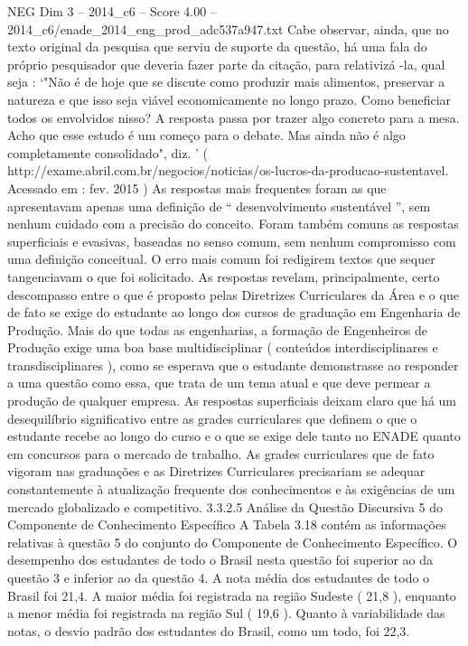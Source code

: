 \begin{textsample}{NEG Dim 3 – 2014\_c6 – Score 4.00 – 2014\_c6/enade\_2014\_eng\_prod\_adc537a947.txt}
Cabe observar, ainda, que no texto original da pesquisa que serviu de suporte da questão, há uma fala do próprio pesquisador que deveria fazer parte da citação, para relativizá -la, qual seja : ‘"Não é de hoje que se discute como produzir mais alimentos, preservar a natureza e que isso seja viável economicamente no longo prazo.
Como beneficiar todos os envolvidos nisso?
A resposta passa por trazer algo concreto para a mesa.
Acho que esse estudo é um começo para o debate.
Mas ainda não é algo completamente consolidado", diz. ’ ( http://exame.abril.com.br/negocios/noticias/os-lucros-da-producao-sustentavel.
Acessado em : fev. 2015 ) As respostas mais frequentes foram as que apresentavam apenas uma definição de “ desenvolvimento sustentável ”, sem nenhum cuidado com a precisão do conceito.
Foram também comuns as respostas superficiais e evasivas, baseadas no senso comum, sem nenhum compromisso com uma definição conceitual.
O erro mais comum foi redigirem textos que sequer tangenciavam o que foi solicitado.
As respostas revelam, principalmente, certo descompasso entre o que é proposto pelas Diretrizes Curriculares da Área e o que de fato se exige do estudante ao longo dos cursos de graduação em Engenharia de Produção.
Mais do que todas as engenharias, a formação de Engenheiros de Produção exige uma boa base multidisciplinar ( conteúdos interdisciplinares e transdisciplinares ), como se esperava que o estudante demonstrasse ao responder a uma questão como essa, que trata de um tema atual e que deve permear a produção de qualquer empresa.
As respostas superficiais deixam claro que há um desequilíbrio significativo entre as grades curriculares que definem o que o estudante recebe ao longo do curso e o que se exige dele tanto no ENADE quanto em concursos para o mercado de trabalho.
As grades curriculares que de fato vigoram nas graduações e as Diretrizes Curriculares precisariam se adequar constantemente à atualização frequente dos conhecimentos e às exigências de um mercado globalizado e competitivo. 3.3.2.5 Análise da Questão Discursiva 5 do Componente de Conhecimento Específico A Tabela 3.18 contém as informações relativas à questão 5 do conjunto do Componente de Conhecimento Específico.
O desempenho dos estudantes de todo o Brasil nesta questão foi superior ao da questão 3 e inferior ao da questão 4.
A nota média dos estudantes de todo o Brasil foi 21,4.
A maior média foi registrada na região Sudeste ( 21,8 ), enquanto a menor média foi registrada na região Sul ( 19,6 ).
Quanto à variabilidade das notas, o desvio padrão dos estudantes do Brasil, como um todo, foi 22,3.

\end{textsample}
